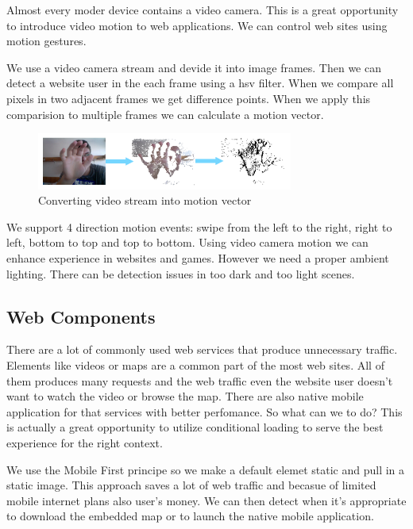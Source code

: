 \documentclass{iitsrc}
\begin{document}
Almost every moder device contains a video camera. This is a great opportunity to introduce video motion to web applications. We can control web sites using motion gestures.

We use a video camera stream and devide it into image frames. Then we can detect a website user in the each frame using a hsv filter. When we compare all pixels in two adjacent frames we get difference points. When we apply this comparision to multiple frames we can calculate a motion vector.

\begin{figure}[h]
    \begin{center}
        \includegraphics[width=0.75\textwidth]{../images/videomotion}
        \caption{Converting video stream into motion vector}
        \label{fig:videomotion}
    \end{center}
\end{figure}

We support 4 direction motion events: swipe from the left to the right, right to left, bottom to top and top to bottom. Using video camera motion we can enhance experience in websites and games. However we need a proper ambient lighting. There can be detection issues in too dark and too light scenes.




\subsection{Web Components} %
\label{sub:web_components}

There are a lot of commonly used web services that produce unnecessary traffic. Elements like videos or maps are a common part of the most web sites. All of them produces many requests and the web traffic even the website user doesn't want to watch the video or browse the map. There are also native mobile application for that services with better perfomance. So what can we to do? This is actually a great opportunity to utilize conditional loading to serve the best experience for the right context.

We use the Mobile First principe so we make a default elemet static and pull in a static image. This approach saves a lot of web traffic and becasue of limited mobile internet plans also user's money. We can then detect when it’s appropriate to download the embedded map or to launch the native mobile application.
\end{document}
